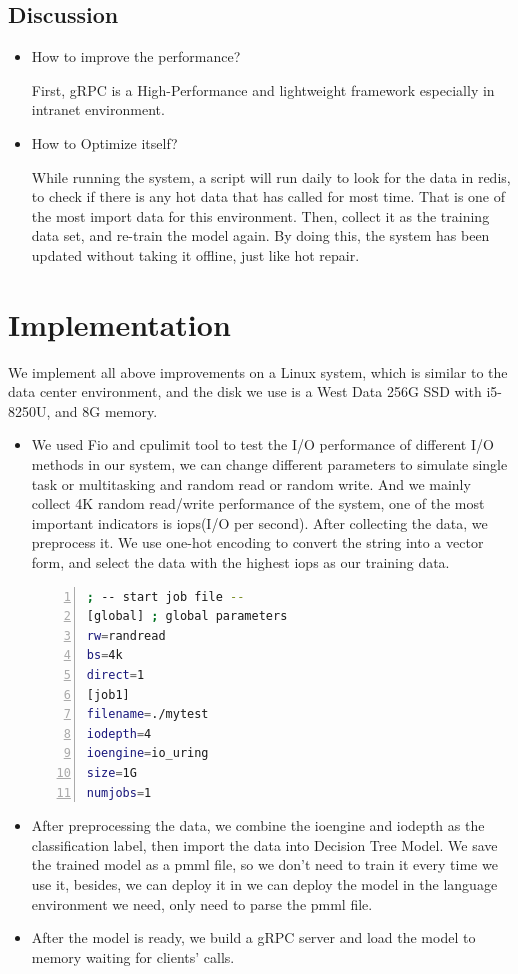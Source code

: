 \documentclass[conference]{IEEEtran}
\begin{document}
\subsection{Discussion}
\begin{itemize}
	\item How to improve the performance?

	      First, gRPC is a High-Performance and lightweight framework especially in intranet environment.

	\item How to Optimize itself?

	      While running the system, a script will run daily to look for the data in redis, to check if there is any hot data that has called for most time.
	      That is one of the most import data for this environment. Then, collect it as the training data set, and re-train the model again.
	      By doing this, the system has been updated without taking it offline, just like hot repair.

\end{itemize}


\section{Implementation}
We implement all above improvements on a Linux system, which is similar to the data center environment, and the disk we use is a West Data 256G SSD with i5-8250U, and 8G memory.
\begin{itemize}

	\item We used Fio and cpulimit tool to test the I/O performance of different I/O methods in our system,
	 we can change different parameters to simulate single task or multitasking and random read or random write.
	 And we mainly collect 4K random read/write performance of the system, one of the most important indicators is iops(I/O per second).
	 After collecting the data, we preprocess it. We use one-hot encoding to convert the string into a vector form, and select the data with the highest iops as our training data.


	      \begin{lstlisting}[language={bash},
		basicstyle=\normalsize\menlo,
        numbers=left]
; -- start job file --
[global] ; global parameters
rw=randread 
bs=4k
direct=1
[job1]
filename=./mytest
iodepth=4
ioengine=io_uring
size=1G
numjobs=1
\end{lstlisting}

	\item After preprocessing the data, we combine the ioengine and iodepth as the classification label, then import the data into Decision Tree Model. 
	We save the trained model as a pmml file, so we don't need to train it every time we use it, besides, we can deploy it in we can deploy the model in the language environment we need, only need to parse the pmml file.
	\item After the model is ready, we build a gRPC server and load the model to memory waiting for clients' calls.
\end{itemize}
\end{document}
